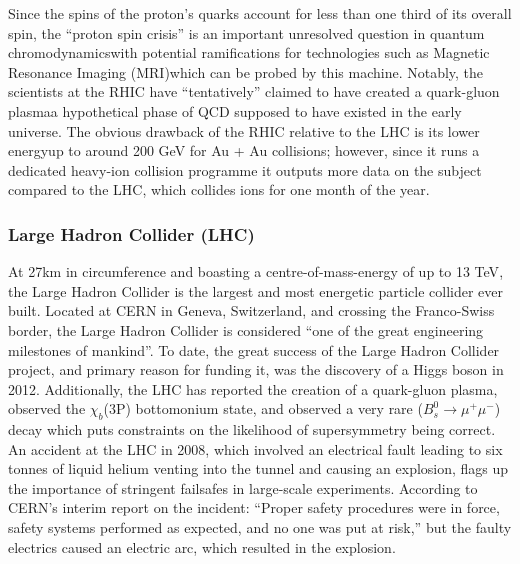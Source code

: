 Since the spins of the proton's quarks account for less than one third of its overall spin\cite{PhysLettB:ProtonSpin}, the ``proton spin crisis'' is an important unresolved question in quantum chromodynamics\textemdash with potential ramifications for technologies such as Magnetic Resonance Imaging (MRI)\textemdash which can be probed by this machine. Notably, the scientists at the RHIC have ``tentatively'' claimed to have created a quark-gluon plasma\cite{NucPhysA:QuarkGluon}\textemdash a hypothetical phase of QCD supposed to have existed in the early universe\cite{CERN:QuarkGluonPlasma:Online}. The obvious drawback of the RHIC relative to the LHC is its lower energy\textemdash up to around 200 GeV for Au + Au collisions; however, since it runs a dedicated heavy-ion collision programme it outputs more data on the subject compared to the LHC, which collides ions for one month of the year.

\subsubsection{Large Hadron Collider (LHC)}
At 27km in circumference and boasting a centre-of-mass-energy of up to 13 TeV\cite{LHC:14TeV:Online,CERN:14TeV:Online}, the Large Hadron Collider is the largest and most energetic particle collider ever built\cite{LHC:Home}. Located at CERN in Geneva, Switzerland, and crossing the Franco-Swiss border, the Large Hadron Collider is considered ``one of the great engineering milestones of mankind''\cite{LHC:Milestone:Online}. To date, the great success of the Large Hadron Collider project, and primary reason for funding it, was the discovery of a Higgs boson in 2012\cite{PhysLettB:Higgs:ATLAS,PhysLettB:Higgs:CMS}. Additionally, the LHC has reported the creation of a quark-gluon plasma\cite{NatGeo:QuarkGluon:Online}, observed the $\chi_{b}$(3P) bottomonium state\cite{arXiv:ATLAS:Bottomonium}, and observed a very rare ($B_{s}^{0} \rightarrow \mu^{+}\mu^{-}$) decay which puts constraints on the likelihood of supersymmetry being correct\cite{BBC:SUSY}. An accident at the LHC in 2008, which involved an electrical fault leading to six tonnes of liquid helium venting into the tunnel and causing an explosion, flags up the importance of stringent failsafes in large-scale experiments.\cite{BBC:MagnetQuench:Online} According to CERN's interim report on the incident: ``Proper safety procedures were in force, safety 
systems performed as expected, and no one was put at risk,'' but the faulty electrics caused an electric arc, which resulted in the explosion\cite{CERN:IncidentReport}.


